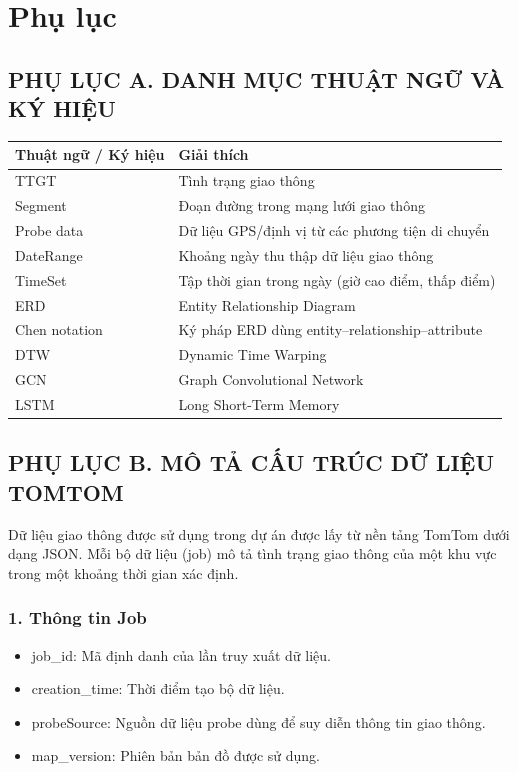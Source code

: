 \section{Phụ lục}

\subsection*{PHỤ LỤC A. DANH MỤC THUẬT NGỮ VÀ KÝ HIỆU}

\begin{tabular}{|p{4cm}|p{10cm}|}
\hline
\textbf{Thuật ngữ / Ký hiệu} & \textbf{Giải thích} \\ \hline
TTGT & Tình trạng giao thông \\ \hline
Segment & Đoạn đường trong mạng lưới giao thông \\ \hline
Probe data & Dữ liệu GPS/định vị từ các phương tiện di chuyển \\ \hline
DateRange & Khoảng ngày thu thập dữ liệu giao thông \\ \hline
TimeSet & Tập thời gian trong ngày (giờ cao điểm, thấp điểm) \\ \hline
ERD & Entity Relationship Diagram \\ \hline
Chen notation & Ký pháp ERD dùng entity–relationship–attribute \\ \hline
DTW & Dynamic Time Warping \\ \hline
GCN & Graph Convolutional Network \\ \hline
LSTM & Long Short-Term Memory \\ \hline
\end{tabular}

\subsection*{PHỤ LỤC B. MÔ TẢ CẤU TRÚC DỮ LIỆU TOMTOM}

Dữ liệu giao thông được sử dụng trong dự án được lấy từ nền tảng TomTom dưới dạng JSON.
Mỗi bộ dữ liệu (job) mô tả tình trạng giao thông của một khu vực trong một khoảng thời gian xác định.

\subsubsection*{1. Thông tin Job}
\begin{itemize}
    \item job\_id: Mã định danh của lần truy xuất dữ liệu.
    \item creation\_time: Thời điểm tạo bộ dữ liệu.
    \item probeSource: Nguồn dữ liệu probe dùng để suy diễn thông tin giao thông.
    \item map\_version: Phiên bản bản đồ được sử dụng.
\end{itemize}

